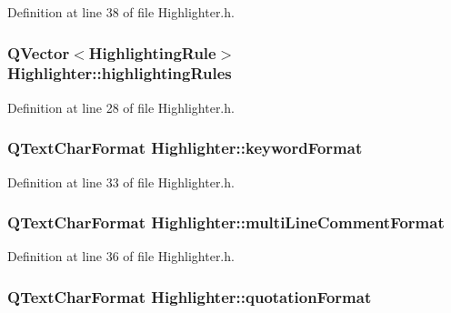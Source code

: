Definition at line 38 of file Highlighter.\-h.

\hypertarget{class_highlighter_aa23f8b3f4ddd1354f508b46d77897fe5}{
\subsubsection[{highlighting\-Rules}]{\setlength{\rightskip}{0pt plus 5cm}Q\-Vector$<${\bf Highlighting\-Rule}$>$ Highlighter\-::highlighting\-Rules\hspace{0.3cm}{\ttfamily [private]}}}\label{class_highlighter_aa23f8b3f4ddd1354f508b46d77897fe5}


Definition at line 28 of file Highlighter.\-h.

\hypertarget{class_highlighter_acf807339a8cd02097a81e455ef2686d2}{
\subsubsection[{keyword\-Format}]{\setlength{\rightskip}{0pt plus 5cm}Q\-Text\-Char\-Format Highlighter\-::keyword\-Format\hspace{0.3cm}{\ttfamily [private]}}}\label{class_highlighter_acf807339a8cd02097a81e455ef2686d2}


Definition at line 33 of file Highlighter.\-h.

\hypertarget{class_highlighter_ad4661760f22cf913b696ec90dea994c0}{
\subsubsection[{multi\-Line\-Comment\-Format}]{\setlength{\rightskip}{0pt plus 5cm}Q\-Text\-Char\-Format Highlighter\-::multi\-Line\-Comment\-Format\hspace{0.3cm}{\ttfamily [private]}}}\label{class_highlighter_ad4661760f22cf913b696ec90dea994c0}


Definition at line 36 of file Highlighter.\-h.

\hypertarget{class_highlighter_a3d4bf96c8ea27ba18bca4adc6b306db8}{
\subsubsection[{quotation\-Format}]{\setlength{\rightskip}{0pt plus 5cm}Q\-Text\-Char\-Format Highlighter\-::quotation\-Format\hspace{0.3cm}{\ttfamily [private]}}}\label{class_highlighter_a3d4bf96c8ea27ba18bca4adc6b306db8}


